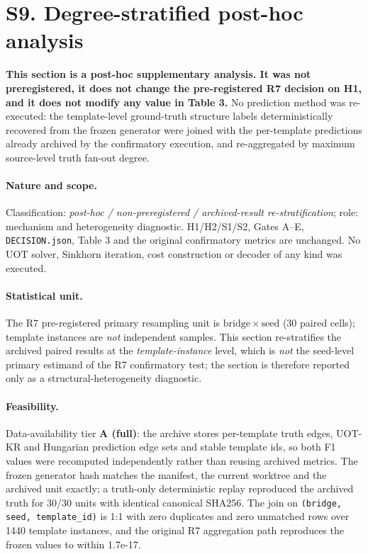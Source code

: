 \section*{S9. Degree-stratified post-hoc analysis}
\textbf{This section is a post-hoc supplementary analysis. It was not preregistered, it
does not change the pre-registered R7 decision on H1, and it does not modify any value in
Table 3.} No prediction method was re-executed: the template-level ground-truth structure
labels deterministically recovered from the frozen generator were joined with the
per-template predictions already archived by the confirmatory execution, and re-aggregated
by maximum source-level truth fan-out degree.

\paragraph{Nature and scope.} Classification: \emph{post-hoc /
non-preregistered / archived-result re-stratification}; role: mechanism and heterogeneity
diagnostic. H1/H2/S1/S2, Gates A--E, \texttt{DECISION.json}, Table 3 and the original
confirmatory metrics are unchanged. No UOT solver, Sinkhorn iteration, cost construction or
decoder of any kind was executed.

\paragraph{Statistical unit.} The R7 pre-registered primary resampling unit is
$\mathrm{bridge}\times\mathrm{seed}$ (30 paired cells);
template instances are \emph{not} independent samples. This section re-stratifies the
archived paired results at the \emph{template-instance} level, which is \emph{not} the
seed-level primary estimand of the R7 confirmatory test; the section is therefore reported
only as a structural-heterogeneity diagnostic.

\paragraph{Feasibility.} Data-availability tier \textbf{A (full)}: the archive stores
per-template truth edges, UOT-KR and Hungarian prediction edge sets and stable template ids,
so both F1 values were recomputed independently rather than reusing archived metrics. The
frozen generator hash matches the manifest, the current worktree and the archived unit
exactly; a truth-only deterministic replay reproduced the archived truth for
30/30 units with identical canonical
SHA256. The join on \texttt{(bridge, seed, template\_id)} is 1:1 with zero duplicates and
zero unmatched rows over 1440 template instances, and the original R7
aggregation path reproduces the frozen values to within 1.7e-17.

